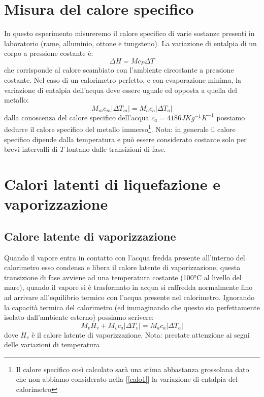 \documentclass[a4paper,10pt,oneside]{article}
\begin{document}
\section{Misura del calore specifico}
In questo esperimento misureremo il calore specifico di varie sostanze presenti in laboratorio (rame, alluminio, ottone e tungsteno). La variazione di entalpia di un corpo a pressione costante è:
\begin{equation}
 \Delta H=M c_P\Delta T
\end{equation}
che corrisponde al calore scambiato con l'ambiente circostante a pressione costante.
Nel caso di un calorimetro perfetto, e con evaporazione minima, la variazione di entalpia dell'acqua deve essere uguale ed opposta a quella del metallo:
\begin{equation}\label{calo1}
 M_mc_m|\Delta T_m|=M_ac_a|\Delta T_a|
\end{equation}
dalla conoscenza del calore specifico dell'acqua $c_a=4186 JKg^{-1}K^{-1}$ possiamo dedurre il calore specifico del metallo immerso\footnote{Il calore specifico così calcolato sarà una stima abbastanza grossolana dato che non abbiamo considerato nella [\ref{calo1}] la variazione di entalpia del calorimetro}. Nota: in generale il calore specifico dipende dalla temperatura e può essere considerato costante solo per brevi intervalli di $T$ lontano dalle transizioni di fase.
\section{Calori latenti di liquefazione e vaporizzazione}

\subsection{Calore latente di vaporizzazione}
Quando il vapore entra in contatto con l'acqua fredda presente all'interno del calorimetro esso condensa e libera il calore latente di vaporizzazione, questa transizione di fase avviene ad una temperatura costante (100°C al livello del mare), quando il vapore si è trasformato in acqua si raffredda normalmente fino ad arrivare all'equilibrio termico con l'acqua presente nel calorimetro.
Ignorando la capacità termica del calorimetro (ed immaginando che questo sia perfettamente isolato dall'ambiente esterno) possiamo scrivere:
\begin{equation}
 M_vH_v+M_vc_a|\Delta T_v|=M_ac_a|\Delta T_a|
\end{equation}
dove $H_v$ è il calore latente di vaporizzazione.
Nota: prestate attenzione ai segni delle variazioni di temperatura
\end{document}
